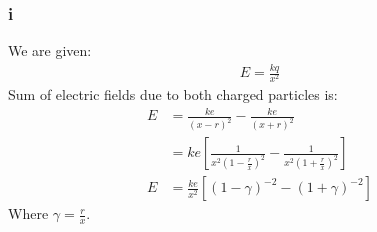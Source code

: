 \documentclass[11pt]{article}
\numberwithin{equation}{section}
\begin{document}
\subsubsection*{i}
We are given:
\begin{align}
E = \frac{kq}{x^2}
\end{align}
Sum of electric fields due to both charged particles is:
\begin{align}
	E &= \frac{ke}{\left( x-r \right)^2} - \frac{ke}{\left( x+r \right)^2}\\
	&= ke \left[ \frac{1}{x^2\left( 1 - \frac{r}{x} \right)^2} - \frac{1}{x^2\left( 1 + \frac{r}{x} \right)^2} \right]\\
	E&= \frac{ke}{x^2} \left[ \left( 1- \gamma \right)^{-2} - \left( 1 + \gamma\right)^{-2} \right]
\end{align}
Where $\gamma =\frac{r}{x}$.
\end{document}
